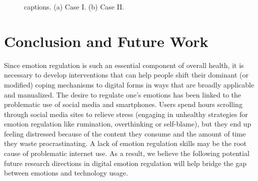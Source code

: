 \documentclass[lettersize,journal]{IEEEtran}
\begin{document}
\begin{figure}[!t]
\centering
{}
\hfil
{}
\caption{captions. (a) Case I. (b) Case II.}
\label{fig_sim}
\end{figure}



 




\section{Conclusion and Future Work}
Since emotion regulation is such an essential component of overall health, it is necessary to develop interventions that can help people shift their dominant (or modified) coping mechanisms to digital forms in ways that are broadly applicable and manualized. The desire to regulate one's emotions has been linked to the problematic use of social media and smartphones. Users spend hours scrolling through social media sites to relieve stress (engaging in unhealthy strategies for emotion regulation like rumination, overthinking or self-blame), but they end up feeling distressed because of the content they consume and the amount of time they waste procrastinating. A lack of emotion regulation skills may be the root cause of problematic internet use. As a result, we believe the following potential future research directions in digital emotion regulation will help bridge the gap between emotions and technology usage.
\end{document}
